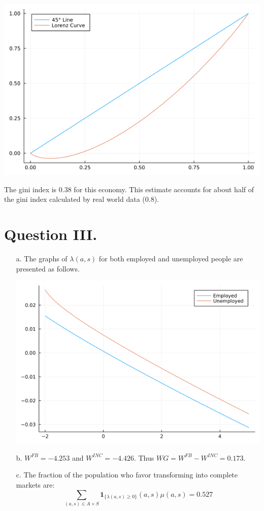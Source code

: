 \documentclass[11pt]{article}
\theoremstyle{definition}
\theoremstyle{definition}
\theoremstyle{definition}
\theoremstyle{definition}
\theoremstyle{definition}
\theoremstyle{definition}
\begin{document}
\begin{itemize}
\begin{center}
	\includegraphics[width=.8\linewidth]{./julia/lorenz_curve.png}
\end{center}
The gini index is 0.38 for this economy. This estimate accounts for about half of the gini index calculated by real world data (0.8).
\end{itemize}	


\pagebreak


\section*{Question III.}

\begin{itemize}
\item[a.] The graphs of $\lambda(a,s)$ for both employed and unemployed people are presented as follows.
\begin{center}
	\includegraphics[width=.8\linewidth]{./julia/lambda.png}
\end{center}
\item[b.] $W^{FB}=-4.253$ and $W^{INC}=-4.426$. Thus $WG=W^{FB}-W^{INC}=0.173$.\\

\item[c.] The fraction of the population who favor transforming into complete markets are:
\begin{equation*}
	\sum_{(a,s)\in A \times S} \textbf{1}_{\{\lambda(a,s)\ge0\}}(a,s)\mu(a,s)=0.527
\end{equation*}
\end{itemize}
	
\end{document}
